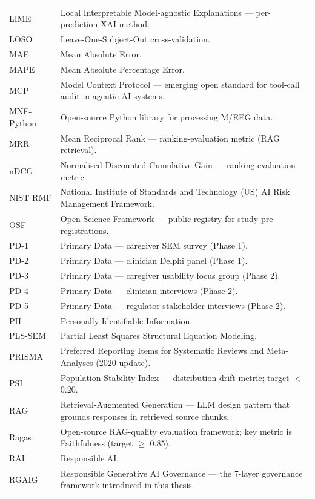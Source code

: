 {\begin{xltabular}{\textwidth}{@{} >{\raggedright\arraybackslash}p{2.6cm} L @{}}
LIME & Local Interpretable Model-agnostic Explanations --- per-prediction XAI method. \\
LOSO & Leave-One-Subject-Out cross-validation. \\
MAE & Mean Absolute Error. \\
MAPE & Mean Absolute Percentage Error. \\
MCP & Model Context Protocol --- emerging open standard for tool-call audit in agentic AI systems. \\
MNE-Python & Open-source Python library for processing M/EEG data. \\
MRR & Mean Reciprocal Rank --- ranking-evaluation metric (RAG retrieval). \\
nDCG & Normalised Discounted Cumulative Gain --- ranking-evaluation metric. \\
NIST RMF & National Institute of Standards and Technology (US) AI Risk Management Framework. \\
OSF & Open Science Framework --- public registry for study pre-registrations. \\
PD-1 & Primary Data --- caregiver SEM survey (Phase 1). \\
PD-2 & Primary Data --- clinician Delphi panel (Phase 1). \\
PD-3 & Primary Data --- caregiver usability focus group (Phase 2). \\
PD-4 & Primary Data --- clinician interviews (Phase 2). \\
PD-5 & Primary Data --- regulator stakeholder interviews (Phase 2). \\
PII & Personally Identifiable Information. \\
PLS-SEM & Partial Least Squares Structural Equation Modeling. \\
PRISMA & Preferred Reporting Items for Systematic Reviews and Meta-Analyses (2020 update). \\
PSI & Population Stability Index --- distribution-drift metric; target $<$ 0.20. \\
RAG & Retrieval-Augmented Generation --- LLM design pattern that grounds responses in retrieved source chunks. \\
Ragas & Open-source RAG-quality evaluation framework; key metric is Faithfulness (target $\geq$ 0.85). \\
RAI & Responsible AI. \\
RGAIG & Responsible Generative AI Governance --- the 7-layer governance framework introduced in this thesis. \\

\end{xltabular}}
